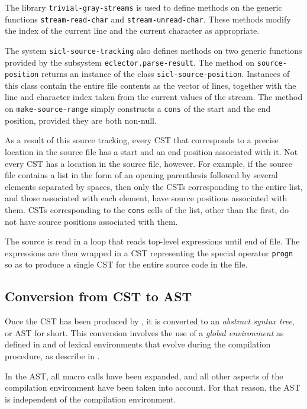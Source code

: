 The library \texttt{trivial-gray-streams} is used to define methods on
the generic functions \texttt{stream-read-char} and
\texttt{stream-unread-char}.  These methods modify the index of the
current line and the current character as appropriate.

The system \texttt{sicl-source-tracking} also defines methods on two
generic functions provided by the \eclector{} subsystem
\texttt{eclector.parse-result}.  The method on
\texttt{source-position} returns an instance of the class
\texttt{sicl-source-position}.  Instances of this class contain the
entire file contents as the vector of lines, together with the line
and character index taken from the current values of the stream.  The
method on \texttt{make-source-range} simply constructs a \texttt{cons}
of the start and the end position, provided they are both non-null.

As a result of this source tracking, every CST that corresponds to a
precise location in the source file has a start and an end position
associated with it.  Not every CST has a location in the source file,
however.  For example, if the source file contains a list in the form
of an opening parenthesis followed by several elements separated by
spaces, then only the CSTs corresponding to the entire list, and those
associated with each element, have source positions associated with
them.  CSTs corresponding to the \texttt{cons} cells of the list,
other than the first, do not have source positions associated with
them.

The source is read in a loop that reads top-level expressions until
end of file.  The expressions are then wrapped in a CST representing
the special operator \texttt{progn} so as to produce a single CST for
the entire source code in the file.

\subsection{Conversion from CST to AST}

Once the CST has been produced by \eclector{}, it is converted to an
\emph{abstract syntax tree}, or AST for short.  This conversion
involves the use of a \emph{global environment} as defined in
 and of lexical
environments that evolve during the compilation procedure, as describe
in .

In the AST, all macro calls have been expanded, and all other aspects
of the compilation environment have been taken into account.  For that
reason, the AST is independent of the compilation environment.


